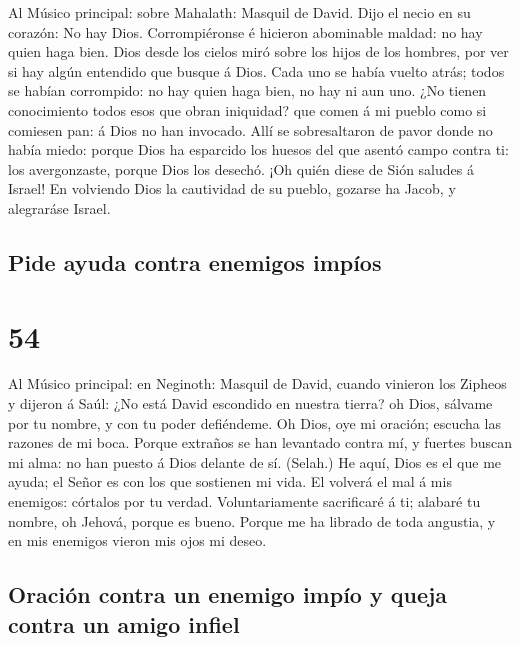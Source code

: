  Al Músico principal: sobre Mahalath: Masquil de David.
Dijo el necio en su corazón: No hay Dios. Corrompiéronse é hicieron
abominable maldad: no hay quien haga bien.  Dios desde los
cielos miró sobre los hijos de los hombres, por ver si hay algún
entendido que busque á Dios.  Cada uno se había vuelto
atrás; todos se habían corrompido: no hay quien haga bien, no hay ni aun
uno.  ¿No tienen conocimiento todos esos que obran
iniquidad? que comen á mi pueblo como si comiesen pan: á Dios no han
invocado.  Allí se sobresaltaron de pavor donde no había
miedo: porque Dios ha esparcido los huesos del que asentó campo contra
ti: los avergonzaste, porque Dios los desechó.  ¡Oh quién
diese de Sión saludes á Israel! En volviendo Dios la cautividad de su
pueblo, gozarse ha Jacob, y alegraráse Israel.

\hypertarget{pide-ayuda-contra-enemigos-impuxedos}{%
\subsection{Pide ayuda contra enemigos
impíos}\label{pide-ayuda-contra-enemigos-impuxedos}}

\hypertarget{section-53}{%
\section{54}\label{section-53}}

 Al Músico principal: en Neginoth: Masquil de David,
cuando vinieron los Zipheos y dijeron á Saúl: ¿No está David escondido
en nuestra tierra? oh Dios, sálvame por tu nombre, y con tu poder
defiéndeme.  Oh Dios, oye mi oración; escucha las razones
de mi boca.  Porque extraños se han levantado contra mí, y
fuertes buscan mi alma: no han puesto á Dios delante de sí. (Selah.)
 He aquí, Dios es el que me ayuda; el Señor es con los que
sostienen mi vida.  El volverá el mal á mis enemigos:
córtalos por tu verdad.  Voluntariamente sacrificaré á ti;
alabaré tu nombre, oh Jehová, porque es bueno.  Porque me
ha librado de toda angustia, y en mis enemigos vieron mis ojos mi deseo.

\hypertarget{oraciuxf3n-contra-un-enemigo-impuxedo-y-queja-contra-un-amigo-infiel}{%
\subsection{Oración contra un enemigo impío y queja contra un amigo
infiel}\label{oraciuxf3n-contra-un-enemigo-impuxedo-y-queja-contra-un-amigo-infiel}}

